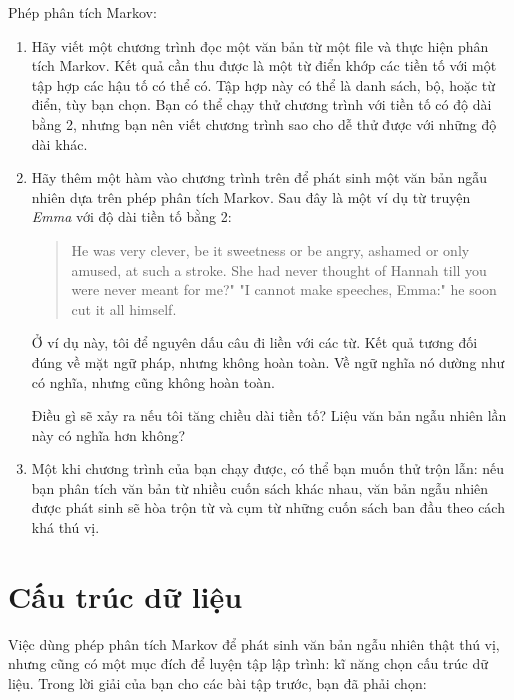 \documentclass[11pt]{book}
\begin{document}
\begin{ex}
Phép phân tích Markov:

\begin{enumerate}

\item Hãy viết một chương trình đọc một văn bản từ một file và thực hiện
phân tích Markov. Kết quả cần thu được là một từ điển khớp các tiền tố
với một tập hợp các hậu tố có thể có. Tập hợp này có thể là danh sách,
bộ, hoặc từ điển, tùy bạn chọn. Bạn có thể chạy thử chương trình với 
tiền tố có độ dài bằng 2, nhưng bạn nên viết chương trình sao cho 
dễ thử được với những độ dài khác.

\item Hãy thêm một hàm vào chương trình trên để phát sinh một văn bản
ngẫu nhiên dựa trên phép phân tích Markov. Sau đây là một ví dụ từ truyện 
{\em Emma} với độ dài tiền tố bằng 2:

\begin{quote}
He was very clever, be it sweetness or be angry, ashamed or only
amused, at such a stroke. She had never thought of Hannah till you
were never meant for me?" "I cannot make speeches, Emma:" he soon cut
it all himself.
\end{quote}

Ở ví dụ này, tôi để nguyên dấu câu đi liền với các từ. 
Kết quả tương đối đúng về mặt ngữ pháp, nhưng không hoàn toàn.
Về ngữ nghĩa nó dường như có nghĩa, nhưng cũng không hoàn toàn.

Điều gì sẽ xảy ra nếu tôi tăng chiều dài tiền tố? Liệu văn bản ngẫu nhiên
lần này có nghĩa hơn không?


\item Một khi chương trình của bạn chạy được, có thể bạn muốn thử trộn lẫn:
nếu bạn phân tích văn bản từ nhiều cuốn sách khác nhau, văn bản ngẫu nhiên
được phát sinh sẽ hòa trộn từ và cụm từ những cuốn sách ban đầu
theo cách khá thú vị.

\end{enumerate}
\end{ex}


\section{Cấu trúc dữ liệu}


Việc dùng phép phân tích Markov để phát sinh văn bản ngẫu nhiên thật thú vị,
nhưng cũng có một mục đích để luyện tập lập trình: kĩ năng chọn cấu trúc dữ liệu.
Trong lời giải của bạn cho các bài tập trước, bạn đã phải chọn:
\end{document}
